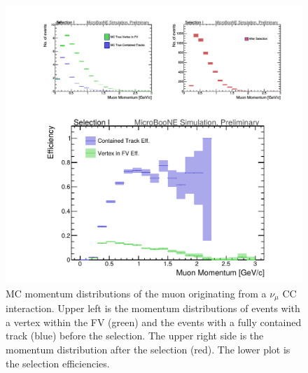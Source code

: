 \begin{figure}[htp!]
\includegraphics[width=\textwidth]{figs/truth_mumomentum.png}
\caption{MC momentum distributions of the muon originating from a $\nu_{\mu}$ CC interaction. Upper left is the momentum distributions of events with a vertex within the FV (green) and the events with a fully contained track (blue) before the selection. The upper right side is the momentum distribution after the selection (red). The lower plot is the selection efficiencies.}
\label{fig:p}
\end{figure}

